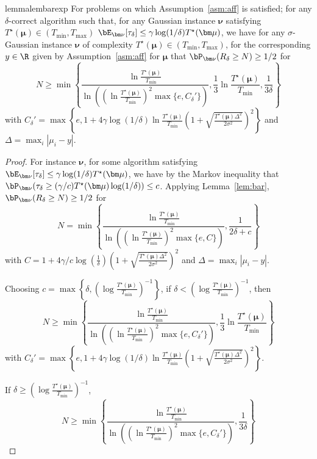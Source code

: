 \begin{restatable}{lemma}{lembarexp}\label{lem:barexp}
	For problems on which Assumption~\ref{asm:aff} is satisfied; 
	for any $\delta$-correct algorithm such that, for any Gaussian instance $\bm\nu$ satisfying $T^\star(\bm\mu)\in (T_{\min},T_{\max})$ $\bE_{\bm\nu}[\tau_\delta]\leq \gamma\log(1/\delta) T^\star(\bm\mu)$, we have for any $\sigma$-Gaussian instance $\bm\nu$ of complexity $T^\star(\bm\mu)\in (T_{\min},T_{\max})$, for the corresponding $y\in\R$ given by Assumption~\ref{asm:aff} for $\bm\mu$ that $\bP_{\bm\nu} (R_\delta\geq N)\geq 1/2$ for \[ N \geq \min\left\{ \frac{\ln \frac{T^\star(\bm\mu)}{T_{\min}}}{\ln\left( \left(\ln \frac{T^\star(\bm\mu)}{T_{\min}}\right)^2 \max\{e,C_\delta'\}  \right)},\frac{1}{3} \ln \frac{T^\star(\bm\mu)}{T_{\min}},\frac{1}{3\delta}\right\}\] with $C_\delta'=\max\left\{e,1+4\gamma\log(1/\delta)\ln \frac{T^\star(\bm\mu)}{T_{\min}}\left(1+\sqrt{\frac{T^\star(\bm\mu)\Delta^2}{2\sigma^2}}\right)^2 \right\}$ and $\Delta = \max_i |\mu_i -y|$.
\end{restatable}

\begin{proof}
For instance $\bm\nu$, for some algorithm satisfying $\bE_{\bm\nu}[\tau_\delta]\leq \gamma \log(1/\delta) T^\star(\bm\mu)$, we have by the Markov inequality that $\bP_{\bm\nu}(\tau_\delta \geq (\gamma/c) T^\star(\bm\mu) \log(1/\delta)) \leq c$.
Applying Lemma~\ref{lem:bar}, $\bP_{\bm\nu} (R_\delta\geq N)\geq 1/2$ for \[N = \min\left\{\frac{\ln \frac{T^\star(\bm\mu)}{T_{\min}}}{\ln\left( \left(\ln \frac{T^\star(\bm\mu)}{T_{\min}}\right)^2 \max\{e,C\} \right)},\frac{1}{2\delta+c}\right\}\] with $C=1+4\gamma/c\log(\frac{1}{\delta})\left(1+\sqrt{\frac{T^\star(\bm\mu)\Delta^2}{2\sigma^2}}\right)^2$ and $\Delta = \max_i |\mu_i -y|$.

Choosing $c = \max\left\{ \delta,\left( \log\frac{T^\star(\bm\mu)}{T_{\min}}\right)^{-1}\right\}$, if $\delta < \left( \log\frac{T^\star(\bm\mu)}{T_{\min}}\right)^{-1}$, then \[ N \geq \min\left\{ \frac{\ln \frac{T^\star(\bm\mu)}{T_{\min}}}{\ln\left( \left(\ln \frac{T^\star(\bm\mu)}{T_{\min}}\right)^2 \max\{e,C_\delta'\}  \right)},\frac{1}{3} \ln \frac{T^\star(\bm\mu)}{T_{\min}}\right\}\] with $C_\delta'=\max\left\{e,1+4\gamma\log(1/\delta)\ln \frac{T^\star(\bm\mu)}{T_{\min}}\left(1+\sqrt{\frac{T^\star(\bm\mu)\Delta^2}{2\sigma^2}}\right)^2 \right\}$.

If $\delta \geq \left( \log\frac{T^\star(\bm\mu)}{T_{\min}}\right)^{-1}$, \[N \geq \min\left\{\frac{\ln \frac{T^\star(\bm\mu)}{T_{\min}}}{\ln\left( \left(\ln \frac{T^\star(\bm\mu)}{T_{\min}}\right)^2 \max\{e,C_\delta'\} \right)},\frac{1}{3\delta}\right\}\]



\end{proof}












